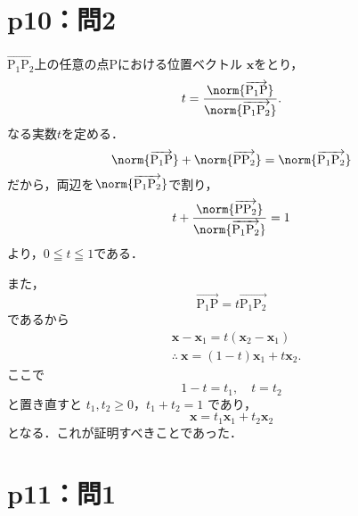 \section*{p10：問2}
\begin{tproof}
  $\overrightarrow{\mathrm{P_1 P_2}}$上の任意の点$\mathrm{P}$における位置ベクトル $\bm{x}$をとり，
  \[
    t =\frac{\norm{\overrightarrow{\mathrm{P_1 P}}}}{\norm{\overrightarrow{\mathrm{P_1 P_2}}}}.
  \]
  なる実数$t$を定める．
  \[
    \norm{\overrightarrow{\mathrm{P_1 P}}}+\norm{\overrightarrow{\mathrm{P P_2}}} =\norm{\overrightarrow{\mathrm{P_1 P_2}}}
  \]
  だから，両辺を$\norm{\overrightarrow{\mathrm{P_1 P_2}}}$で割り，
  \[
    t+\frac{\norm{\overrightarrow{\mathrm{P P_2}}}}{{\norm{\overrightarrow{\mathrm{P_1 P_2}}}}}=1
  \]
  より，$ 0 \leqq t \leqq 1$である．

  また，
  \[
    \overrightarrow{\mathrm{P_1P}} = t \overrightarrow{\mathrm{P_1P_2}}
  \]
  であるから
  \begin{align*}
     & \bm{x}-\bm{x}_1 = t(\bm{x}_2-\bm{x}_1)          \\
     & \therefore ~\bm{x} = (1-t)\bm{x}_1 + t\bm{x}_2.
  \end{align*}
  ここで
  \[
    1-t = t_1,\quad t=t_2
  \]
  と置き直すと $t_1,t_2\ge 0$，$t_1+t_2=1$ であり，
  \[
    \bm{x}=t_1\bm{x}_1+t_2\bm{x}_2
  \]
  となる．これが証明すべきことであった．
\end{tproof}


\section*{p11：問1}

